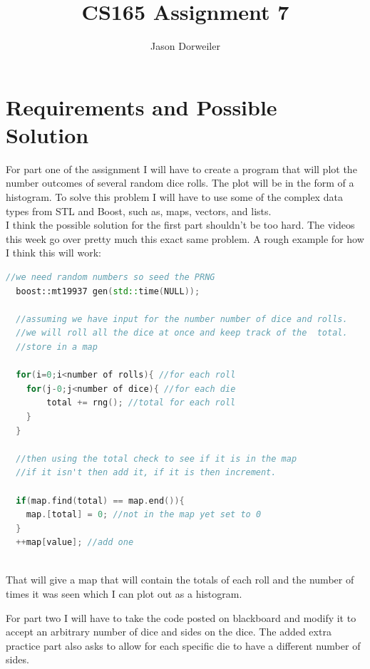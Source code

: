 \documentclass[a4paper,12pt]{article}
\title{CS165 Assignment 7}
\author{Jason Dorweiler}
\begin{document}
\maketitle

\section{Requirements and Possible Solution}

For part one of the assignment I will have to create a program that will plot the number outcomes of several random dice rolls.  The plot will be in the form of a histogram.  To solve this problem I will have to use some of the complex data types from STL and Boost, such as, maps, vectors, and lists.  \\

I think the possible solution for the first part shouldn't be too hard.  The videos this week go over pretty much this exact same problem.  A rough example for how I think this will work:

  \begin{lstlisting}[language=cpp,caption={code for pt 1}]
  //we need random numbers so seed the PRNG
  boost::mt19937 gen(std::time(NULL));
  
  //assuming we have input for the number number of dice and rolls.
  //we will roll all the dice at once and keep track of the  total. 
  //store in a map
  
  for(i=0;i<number of rolls){ //for each roll
  	for(j-0;j<number of dice){ //for each die
  		total += rng(); //total for each roll
  	}
  }
  
  //then using the total check to see if it is in the map
  //if it isn't then add it, if it is then increment.
  
  if(map.find(total) == map.end()){
  	map.[total] = 0; //not in the map yet set to 0
  }
  ++map[value]; //add one
  
  \end{lstlisting}
  
That will give a map that will contain the totals of each roll and the number of times it was seen which I can plot out as a histogram. 

For part two I will have to take the code posted on blackboard and modify it to accept an arbitrary number of dice and sides on the dice. The added extra practice part also asks to allow for each specific die to have a different number of sides.  \\
\end{document}
